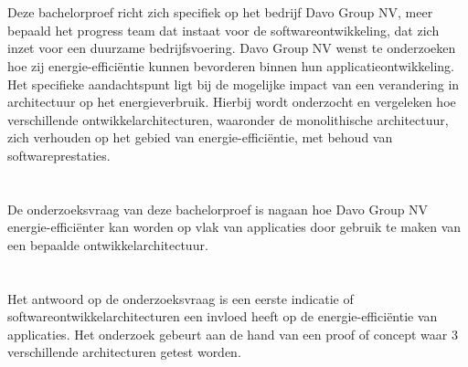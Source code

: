 \section{}%
\label{sec:probleemstelling}

Deze bachelorproef richt zich specifiek op het bedrijf Davo Group NV, meer bepaald het progress team dat instaat voor de softwareontwikkeling, dat zich inzet voor een duurzame bedrijfsvoering. Davo Group NV wenst te onderzoeken hoe zij energie-efficiëntie kunnen bevorderen binnen hun applicatieontwikkeling. Het specifieke aandachtspunt ligt bij de mogelijke impact van een verandering in architectuur op het energieverbruik. Hierbij wordt onderzocht en vergeleken hoe verschillende ontwikkelarchitecturen, waaronder de monolithische architectuur, zich verhouden op het gebied van energie-efficiëntie, met behoud van softwareprestaties.
 

\section{}%
\label{sec:onderzoeksvraag}
De onderzoeksvraag van deze bachelorproef is nagaan hoe Davo Group NV energie-efficiënter kan worden op vlak van applicaties door gebruik te maken van een bepaalde ontwikkelarchitectuur.


\section{}%
\label{sec:onderzoeksdoelstelling}
Het antwoord op de onderzoeksvraag is een eerste indicatie of softwareontwikkelarchitecturen een invloed heeft op de energie-efficiëntie van applicaties. Het onderzoek gebeurt aan de hand van een proof of concept waar 3 verschillende architecturen getest worden. 

